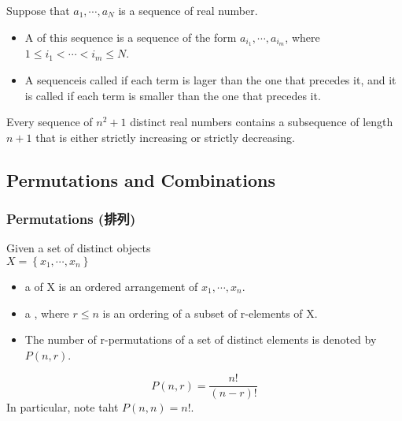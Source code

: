 \begin{definition}
    Suppose that $a_1,\cdots,a_N$ is a sequence of real number.
    \begin{itemize}
        \item A  of this sequence is a sequence of the form $a_{i_1}, \cdots, a_{i_m}$, where $1\le i_1 < \cdots < i_m \le N$.
        \item A sequenceis called  if each term is lager than the one that precedes it, and it is called  if each term is smaller than the one that precedes it. 
    \end{itemize}
\end{definition}

\begin{theorem}
    Every sequence of $n^2+1$ distinct real numbers contains a subsequence of length $n+1$ that is either strictly increasing or strictly decreasing. 
\end{theorem}

\subsection{Permutations and Combinations}
\subsubsection{Permutations (排列)}
\begin{definition}
    Given a set of distinct objects \\
    $X=\left\{ x_1,\cdots, x_n \right\}$
    \begin{itemize}
        \item a  of X is an ordered arrangement of $x_1, \cdots, x_n$.
        \item a , where $r\le n$ is an ordering of a subset of r-elements of X.
        \item The number of r-permutations of a set of distinct elements is denoted by $P(n,r)$.
    \end{itemize}
\end{definition}

\begin{theorem}
    \[ P(n,r)=\frac{n!}{(n-r)!} \]
    In particular, note taht $P(n,n)=n!$.
\end{theorem}

